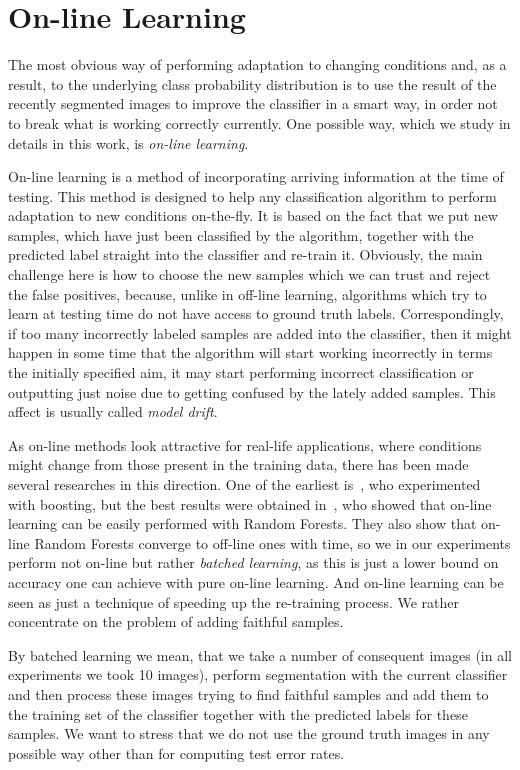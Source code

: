 \chapter{On-line Learning}
\label{chapter_online}

The most obvious way of performing adaptation to changing conditions and, as a result, to the underlying class 
probability distribution is to use the result of the recently segmented images to improve the classifier in a smart way, in order not
to break what is working correctly currently. One possible way, which we study in details in this work, is \emph{on-line learning}.

On-line learning is a method of incorporating arriving information at the time of testing. This method is designed to help any classification algorithm
to perform adaptation to new conditions on-the-fly. It is based on the fact that we put new samples, which have just been classified by the algorithm,
together with the predicted label straight into the classifier and re-train it. Obviously, the main challenge here is how to choose the new samples 
which we can trust and reject the false positives,
because, unlike in off-line learning, algorithms which try to learn at testing time do not have access to ground truth labels. Correspondingly, if too
many incorrectly labeled samples are added into the classifier, then it might happen in some time that the algorithm will start working incorrectly in terms
the initially specified aim, \eg it may start performing incorrect classification or outputting just noise due to getting confused by the lately added
samples. This affect is usually called \emph{model drift}.

As on-line methods look attractive for real-life applications, where conditions might change from those present in the training data, there has been made
several researches in this direction. One of the earliest is~\cite{Osa2001}, who experimented with boosting, but the best results were obtained
in~\cite{Saffari2009}, who showed that on-line learning can be easily performed with Random Forests. They also show that on-line Random Forests converge
to off-line ones with time, so we in our experiments perform not on-line but rather \emph{batched learning}, as this is just a lower bound on 
accuracy one can achieve with pure on-line learning. And on-line learning can be seen as just a technique of speeding up the re-training process.
We rather concentrate on the problem of adding faithful samples.

By batched learning we mean, that we take a number of consequent images (in all experiments we took 10 images), perform segmentation with the current
classifier and then process these images trying to find faithful samples and add them to the training set of the classifier together with the predicted
labels for these samples. We want to stress that we do not use the ground truth images in any possible way other than for computing test error rates.

